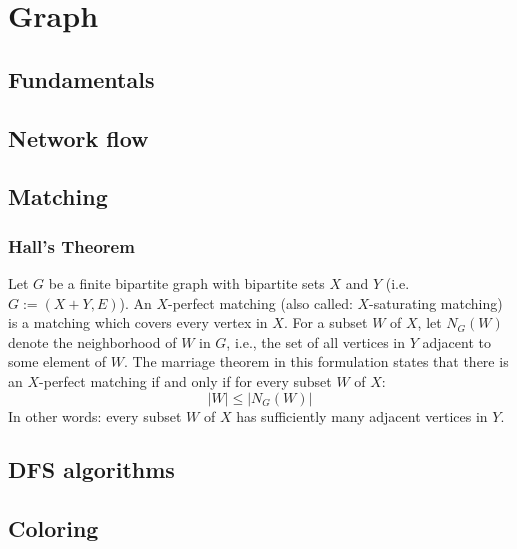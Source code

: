 \chapter{Graph}

\section{Fundamentals}

\section{Network flow}

\section{Matching}
	\subsection{Hall's Theorem}
		Let $G$ be a finite bipartite graph with bipartite sets $X$ and $Y$ (i.e. $G := (X+Y, E)$). 
		An $X$-perfect matching (also called: $X$-saturating matching) is a matching which covers every vertex in $X$. 
		For a subset $W$ of $X$, let $N_{G}(W)$ denote the neighborhood of $W$ in $G$, i.e., the set of all vertices in $Y$ adjacent to some element of $W$. 
		The marriage theorem in this formulation states that there is an $X$-perfect matching if and only if for every subset $W$ of $X$:
		$$|W|\le{}|N_{G}(W)|$$
		In other words: every subset $W$ of $X$ has sufficiently many adjacent vertices in $Y$.

\section{DFS algorithms}

\section{Coloring}

